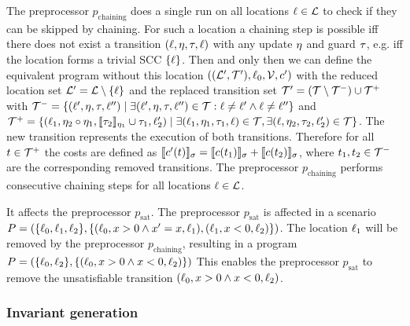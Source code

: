The preprocessor $p_{\text{chaining}}$ does a single run on all locations $\ell \in \mathcal{L}$ to check if they can be skipped by chaining.
For such a location a chaining step is possible iff there does not exist a transition $(\ell,\eta,\tau,\ell)$ with any update $\eta$ and guard $\tau$, e.g. iff the location forms a trivial SCC $\lbrace \ell \rbrace$.
Then and only then we can define the equivalent program without this location $((\mathcal{L}', \mathcal{T}'), \ell_0, \mathcal{V}, c')$ with the reduced location set $\mathcal{L}' = \mathcal{L} \setminus \lbrace \ell \rbrace$ and the replaced transition set $\mathcal{T}' = (\mathcal{T} \setminus \mathcal{T}^-) \cup \mathcal{T}^+$ with $\mathcal{T}^- = \lbrace (\ell',\eta,\tau,\ell'') \mid \exists (\ell',\eta,\tau,\ell'') \in \mathcal{T}: \ell \neq \ell' \wedge \ell \neq \ell'' \rbrace$ and $\mathcal{T}^+ = \lbrace (\ell_1,\eta_2 \circ \eta_1,\llbracket \tau_2 \rrbracket_{\eta_1} \cup \tau_1,\ell_2') \mid \exists (\ell_1,\eta_1,\tau_1,\ell) \in \mathcal{T}, \exists (\ell,\eta_2,\tau_2,\ell_2') \in \mathcal{T} \rbrace$. 
The new transition represents the execution of both transitions.
Therefore for all $t \in \mathcal{T}^+$ the costs are defined as $\llbracket c'(t) \rrbracket_{\sigma} = \llbracket c(t_1) \rrbracket_{\sigma} + \llbracket c(t_2) \rrbracket_{\sigma}$, where $t_1, t_2 \in \mathcal{T}^-$ are the corresponding removed transitions.
The preprocessor $p_{\text{chaining}}$ performs consecutive chaining steps for all locations $\ell \in \mathcal{L}$.

It affects the preprocessor $p_{\text{sat}}$.
The preprocessor $p_{\text{sat}}$ is affected in a scenario $P = (\lbrace \ell_0, \ell_1, \ell_2 \rbrace, \lbrace (\ell_0,x>0 \wedge x'=x,\ell_1), (\ell_1,x<0,\ell_2) \rbrace)$.
The location $\ell_1$ will be removed by the preprocessor $p_{\text{chaining}}$, resulting in a program $P = (\lbrace \ell_0, \ell_2 \rbrace, \lbrace (\ell_0,x>0 \wedge x<0,\ell_2) \rbrace)$
This enables the preprocessor $p_{\text{sat}}$ to remove the unsatisfiable transition $(\ell_0,x>0 \wedge x<0,\ell_2)$.


\subsubsection{Invariant generation}

